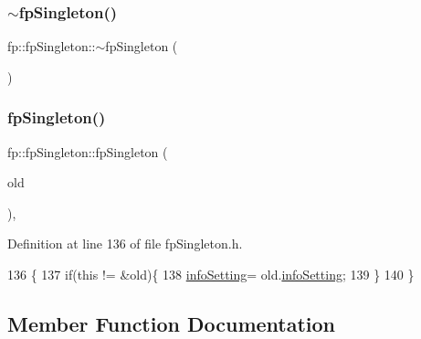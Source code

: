\subsubsection{\texorpdfstring{$\sim$fp\+Singleton()}{~fpSingleton()}}
{\footnotesize\ttfamily fp\+::fp\+Singleton\+::$\sim$fp\+Singleton (\begin{DoxyParamCaption}{ }\end{DoxyParamCaption})\hspace{0.3cm}{\ttfamily [private]}}

\mbox{\label{classfp_1_1fpSingleton_afa7b24ca92c18b7e0f444592c9d8ba30}} 
\subsubsection{\texorpdfstring{fp\+Singleton()}{fpSingleton()}\hspace{0.1cm}{\footnotesize\ttfamily [2/2]}}
{\footnotesize\ttfamily fp\+::fp\+Singleton\+::fp\+Singleton (\begin{DoxyParamCaption}\item[{const \hyperlink{classfp_1_1fpSingleton}{fp\+Singleton} \&}]{old }\end{DoxyParamCaption})\hspace{0.3cm}{\ttfamily [inline]}, {\ttfamily [private]}}



Definition at line 136 of file fp\+Singleton.\+h.


\begin{DoxyCode}
136                                                \{
137                 \textcolor{keywordflow}{if}(\textcolor{keyword}{this} != &old)\{
138                     \hyperlink{classfp_1_1fpSingleton_a0e2c02e7e7f730f59e5c1f10005d581c}{infoSetting}= old.\hyperlink{classfp_1_1fpSingleton_a0e2c02e7e7f730f59e5c1f10005d581c}{infoSetting};
139                 \}
140             \}
\end{DoxyCode}


\subsection{Member Function Documentation}
\mbox{\label{classfp_1_1fpSingleton_a204b85f9d08ca711ca6620b5e020cc1c}} 
